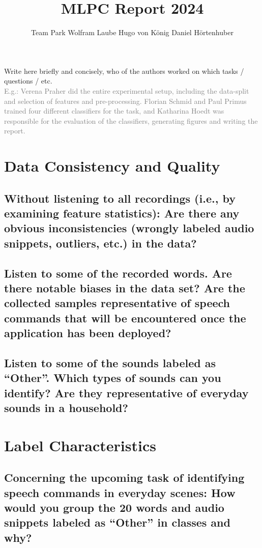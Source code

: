 \documentclass{article}
\title{MLPC Report 2024}
\author{%
  Team Park \AND
  Wolfram Laube
  \And
  Hugo von König 
  \And 
  Daniel Hörtenhuber 
}
\begin{document}
\maketitle


\begin{contributions}
  Write here briefly and concisely, who of the authors worked on which tasks / questions / etc. \\ \textcolor{gray}{E.g.: Verena Praher did the entire experimental setup, including the data-split and selection of features and pre-processing. Florian Schmid and Paul Primus trained four different classifiers for the task, and Katharina Hoedt was responsible for the evaluation of the classifiers, generating figures and writing the report.}
\end{contributions}

\section{Data Consistency and Quality}
\subsection{Without listening to all recordings (i.e., by examining feature statistics): Are
there any obvious inconsistencies (wrongly labeled audio snippets, outliers,
etc.) in the data?}
\subsection{Listen to some of the recorded words. Are there notable biases in the data
set? Are the collected samples representative of speech commands that will
be encountered once the application has been deployed?}
\subsection{Listen to some of the sounds labeled as “Other”. Which types of sounds can
you identify? Are they representative of everyday sounds in a household?}
\section{Label Characteristics}
\subsection{Concerning the upcoming task of identifying speech commands in everyday
scenes: How would you group the 20 words and audio snippets labeled as
“Other” in classes and why?}
\end{document}
